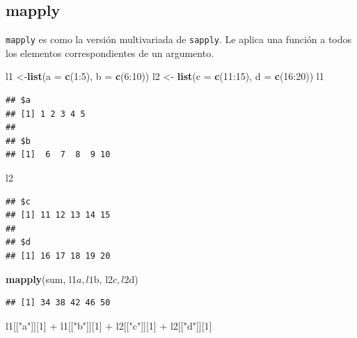 \documentclass[]{article}
\newenvironment{Shaded}{\begin{snugshade}}{\end{snugshade}}
\newcommand{\KeywordTok}[1]{\textcolor[rgb]{0.13,0.29,0.53}{\textbf{{#1}}}}
\newcommand{\DataTypeTok}[1]{\textcolor[rgb]{0.13,0.29,0.53}{{#1}}}
\newcommand{\DecValTok}[1]{\textcolor[rgb]{0.00,0.00,0.81}{{#1}}}
\newcommand{\StringTok}[1]{\textcolor[rgb]{0.31,0.60,0.02}{{#1}}}
\newcommand{\NormalTok}[1]{{#1}}
\begin{document}
\subsection{mapply}\label{mapply}

\texttt{mapply} es como la versión multivariada de \texttt{sapply}. Le
aplica una función a todos los elementos correspondientes de un
argumento.

\begin{Shaded}
\begin{Highlighting}[]
\NormalTok{l1 <-}\KeywordTok{list}\NormalTok{(}\DataTypeTok{a =} \KeywordTok{c}\NormalTok{(}\DecValTok{1}\NormalTok{:}\DecValTok{5}\NormalTok{), }\DataTypeTok{b =} \KeywordTok{c}\NormalTok{(}\DecValTok{6}\NormalTok{:}\DecValTok{10}\NormalTok{))}
\NormalTok{l2 <-}\StringTok{ }\KeywordTok{list}\NormalTok{(}\DataTypeTok{c =} \KeywordTok{c}\NormalTok{(}\DecValTok{11}\NormalTok{:}\DecValTok{15}\NormalTok{), }\DataTypeTok{d =} \KeywordTok{c}\NormalTok{(}\DecValTok{16}\NormalTok{:}\DecValTok{20}\NormalTok{))}
\NormalTok{l1}
\end{Highlighting}
\end{Shaded}

\begin{verbatim}
## $a
## [1] 1 2 3 4 5
## 
## $b
## [1]  6  7  8  9 10
\end{verbatim}

\begin{Shaded}
\begin{Highlighting}[]
\NormalTok{l2}
\end{Highlighting}
\end{Shaded}

\begin{verbatim}
## $c
## [1] 11 12 13 14 15
## 
## $d
## [1] 16 17 18 19 20
\end{verbatim}

\begin{Shaded}
\begin{Highlighting}[]
\KeywordTok{mapply}\NormalTok{(sum, l1$a, l1$b, l2$c, l2$d)}
\end{Highlighting}
\end{Shaded}

\begin{verbatim}
## [1] 34 38 42 46 50
\end{verbatim}

\begin{Shaded}
\begin{Highlighting}[]
\NormalTok{l1[[}\StringTok{"a"}\NormalTok{]][}\DecValTok{1}\NormalTok{] +}\StringTok{ }\NormalTok{l1[[}\StringTok{"b"}\NormalTok{]][}\DecValTok{1}\NormalTok{] +}\StringTok{ }\NormalTok{l2[[}\StringTok{"c"}\NormalTok{]][}\DecValTok{1}\NormalTok{] +}\StringTok{ }\NormalTok{l2[[}\StringTok{"d"}\NormalTok{]][}\DecValTok{1}\NormalTok{]}
\end{Highlighting}
\end{Shaded}
\end{document}
